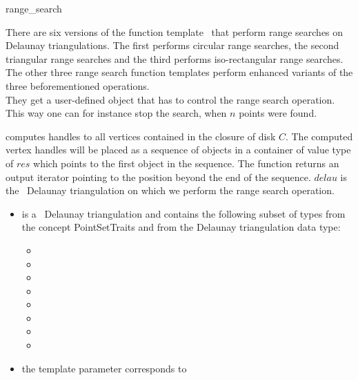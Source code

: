 \begin{ccRefFunction}{range_search}

\ccDefinition  

There are six versions of the function template \ccRefName\ that
perform range searches on Delaunay triangulations. The first performs
circular range searches, the second triangular range searches and the
third performs iso-rectangular range searches. The other three range search
function templates perform enhanced variants of the three beforementioned
operations.\\
They get a user-defined object that has to control the range search operation.
This way one can for instance stop the search, when $n$ points were found. 


{ computes handles to all vertices contained in the closure of disk $C$.
The computed vertex handles will be placed as a sequence of objects in a container of value type
of $res$
which points to the first object in the sequence. The function
returns an output iterator pointing to the position beyond the end
of the sequence.
$delau$ is the \cgal\ Delaunay triangulation on which we perform the range search operation.}

\begin{itemize}
\item {} is a \cgal\ Delaunay triangulation and contains the following subset of types from the concept PointSetTraits and from
the Delaunay triangulation data type:
 \begin{itemize}
  \item {} 
  \item {}
  \item {} 
  \item {}   
  \item {} 
  \item {}  
  \item {} 
  \item {} 
 \end{itemize}
\item the template parameter  corresponds to 
\end{itemize}


\end{ccRefFunction}
